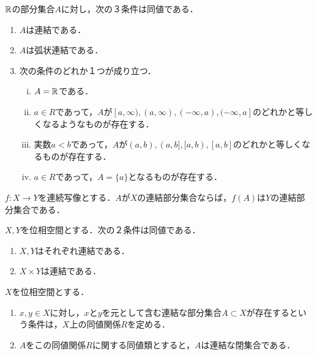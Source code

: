 \documentclass[uplatex, 12pt, dvipdfmx]{jsreport}
\begin{document}
\begin{proposition}[$\R$の連結集合]
    $\R$の部分集合$A$に対し，次の３条件は同値である．
    \begin{enumerate}
        \item $A$は連結である．
        \item $A$は弧状連結である．
        \item 次の条件のどれか１つが成り立つ．
        \begin{enumerate}[(i)]
            \item $A=\mathbb{R}$である．
            \item $a\in R$であって，$A$が$[a,\infty),(a,\infty),(-\infty,a),(-\infty,a]$のどれかと等しくなるようなものが存在する．
            \item 実数$a<b$であって，$A$が$(a,b),(a,b],[a,b),[a,b]$のどれかと等しくなるものが存在する．
            \item $a\in R$であって，$A=\{a\}$となるものが存在する．
        \end{enumerate}
    \end{enumerate}
\end{proposition}

\begin{proposition}
    $f:X\to Y$を連続写像とする．$A$が$X$の連結部分集合ならば，$f(A)$は$Y$の連結部分集合である．
\end{proposition}

\begin{proposition}
    $X,Y$を位相空間とする．次の２条件は同値である．
    \begin{enumerate}
        \item $X,Y$はそれぞれ連結である．
        \item $X\times Y$は連結である．
    \end{enumerate}
\end{proposition}

\begin{proposition}[連結性だけからここまで言えてしまう]\label{prop-connected-component}
    $X$を位相空間とする．
    \begin{enumerate}
        \item $x,y\in X$に対し，$x$と$y$を元として含む連結な部分集合$A\subset X$が存在するという条件は，$X$上の同値関係$R$を定める．
        \item $A$をこの同値関係$R$に関する同値類とすると，$A$は連結な閉集合である．
    \end{enumerate}
\end{proposition}
\end{document}
